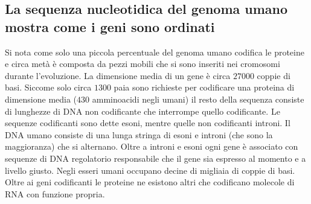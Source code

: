 \subsection{La sequenza nucleotidica del genoma umano mostra come i geni sono ordinati}
Si nota come solo una piccola percentuale del genoma umano codifica le proteine e circa met\`a \`e composta da pezzi mobili che si sono inseriti nei cromosomi durante l'evoluzione. La
dimensione media di un gene \`e circa $27000$ coppie di basi. Siccome solo circa $1300$ paia sono richieste per codificare una proteina di dimensione media ($430$ amminoacidi negli 
umani) il resto della sequenza consiste di lunghezze di DNA non codificante che interrompe quello codificante. Le sequenze codificanti sono dette esoni, mentre quelle non codificanti
introni. Il DNA umano consiste di una lunga stringa di esoni e introni (che sono la maggioranza) che si alternano. Oltre a introni e esoni ogni gene \`e associato con sequenze di DNA
regolatorio responsabile che il gene sia espresso al momento e a livello giusto. Negli esseri umani occupano decine di migliaia di coppie di basi. Oltre ai geni codificanti le proteine
ne esistono altri che codificano molecole di RNA con funzione propria.
